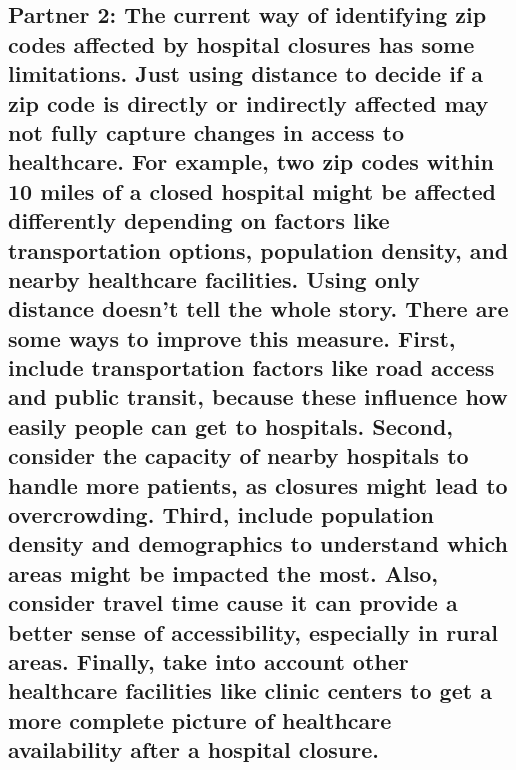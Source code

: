 \documentclass[
  letterpaper,
  DIV=11,
  numbers=noendperiod]{scrartcl}
\begin{document}
\subsection{Partner 2: The current way of identifying zip codes affected
by hospital closures has some limitations. Just using distance to decide
if a zip code is directly or indirectly affected may not fully capture
changes in access to healthcare. For example, two zip codes within 10
miles of a closed hospital might be affected differently depending on
factors like transportation options, population density, and nearby
healthcare facilities. Using only distance doesn't tell the whole story.
There are some ways to improve this measure. First, include
transportation factors like road access and public transit, because
these influence how easily people can get to hospitals. Second, consider
the capacity of nearby hospitals to handle more patients, as closures
might lead to overcrowding. Third, include population density and
demographics to understand which areas might be impacted the most. Also,
consider travel time cause it can provide a better sense of
accessibility, especially in rural areas. Finally, take into account
other healthcare facilities like clinic centers to get a more complete
picture of healthcare availability after a hospital
closure.}\label{partner-2-the-current-way-of-identifying-zip-codes-affected-by-hospital-closures-has-some-limitations.-just-using-distance-to-decide-if-a-zip-code-is-directly-or-indirectly-affected-may-not-fully-capture-changes-in-access-to-healthcare.-for-example-two-zip-codes-within-10-miles-of-a-closed-hospital-might-be-affected-differently-depending-on-factors-like-transportation-options-population-density-and-nearby-healthcare-facilities.-using-only-distance-doesnt-tell-the-whole-story.-there-are-some-ways-to-improve-this-measure.-first-include-transportation-factors-like-road-access-and-public-transit-because-these-influence-how-easily-people-can-get-to-hospitals.-second-consider-the-capacity-of-nearby-hospitals-to-handle-more-patients-as-closures-might-lead-to-overcrowding.-third-include-population-density-and-demographics-to-understand-which-areas-might-be-impacted-the-most.-also-consider-travel-time-cause-it-can-provide-a-better-sense-of-accessibility-especially-in-rural-areas.-finally-take-into-account-other-healthcare-facilities-like-clinic-centers-to-get-a-more-complete-picture-of-healthcare-availability-after-a-hospital-closure.}
\end{document}

